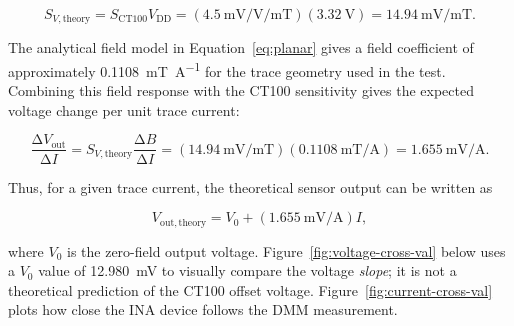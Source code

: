 \documentclass[12pt,a4paper]{article}
\begin{document}
\begin{equation}
S_{V,\mathrm{theory}}
=
S_{\mathrm{CT100}}V_{\mathrm{DD}}
=
\left(\SI{4.5}{\milli\volt\per\volt\per\milli\tesla}\right)
\left(\SI{3.32}{\volt}\right)
=
\SI{14.94}{\milli\volt\per\milli\tesla}.
\label{eq:ct100-voltage-sensitivity}
\end{equation}

The analytical field model in Equation~\eqref{eq:planar} gives a field
coefficient of approximately
\SI{0.1108}{\milli\tesla\per\ampere} for the trace geometry used in the
test. Combining this field response with the CT100 sensitivity gives the
expected voltage change per unit trace current:

\begin{equation}
\frac{\mathrm{   \Delta}V_{\mathrm{out}}}{\mathrm{   \Delta}I}
=
S_{V,\mathrm{theory}}
\frac{\mathrm{   \Delta}B}{\mathrm{   \Delta}I}
=
\left(\SI{14.94}{\milli\volt\per\milli\tesla}\right)
\left(\SI{0.1108}{\milli\tesla\per\ampere}\right)
=
\SI{1.655}{\milli\volt\per\ampere}.
\label{eq:ct100-voltage-current-slope}
\end{equation}

Thus, for a given trace current, the theoretical sensor output can be
written as

\begin{equation}
V_{\mathrm{out,theory}}
=
V_0
+
\left(\SI{1.655}{\milli\volt\per\ampere}\right)I,
\label{eq:ct100-expected-voltage}
\end{equation}

where $V_0$ is the zero-field output voltage. Figure~\ref{fig:voltage-cross-val} below 
uses a $V_0$ value of \SI{12.980}{\milli\volt} to visually compare the voltage
\emph{slope}; it is not a theoretical prediction of the CT100 offset voltage. Figure~\ref{fig:current-cross-val} plots how close the INA device follows the DMM measurement.
\end{document}
